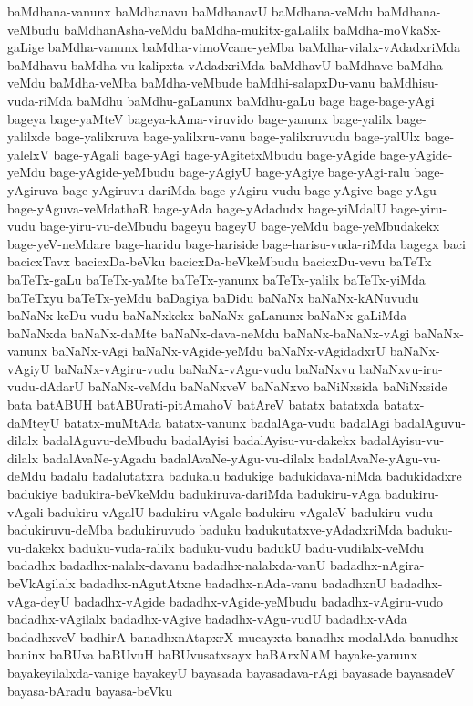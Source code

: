{baMdhana-vanunx
baMdhanavu
baMdhanavU
baMdhana-veMdu
baMdhana-veMbudu
baMdhanAsha-veMdu
baMdha-mukitx-gaLalilx
baMdha-moVkaSx-gaLige
baMdha-vanunx
baMdha-vimoVcane-yeMba
baMdha-vilalx-vAdadxriMda
baMdhavu
baMdha-vu-kalipxta-vAdadxriMda
baMdhavU
baMdhave
baMdha-veMdu
baMdha-veMba
baMdha-veMbude
baMdhi-salapxDu-vanu
baMdhisu-vuda-riMda
baMdhu
baMdhu-gaLanunx
baMdhu-gaLu
bage
bage-bage-yAgi
bageya
bage-yaMteV
bageya-kAma-viruvido
bage-yanunx
bage-yalilx
bage-yalilxde
bage-yalilxruva
bage-yalilxru-vanu
bage-yalilxruvudu
bage-yalUlx
bage-yalelxV
bage-yAgali
bage-yAgi
bage-yAgitetxMbudu
bage-yAgide
bage-yAgide-yeMdu
bage-yAgide-yeMbudu
bage-yAgiyU
bage-yAgiye
bage-yAgi-ralu
bage-yAgiruva
bage-yAgiruvu-dariMda
bage-yAgiru-vudu
bage-yAgive
bage-yAgu
bage-yAguva-veMdathaR
bage-yAda
bage-yAdadudx
bage-yiMdalU
bage-yiru-vudu
bage-yiru-vu-deMbudu
bageyu
bageyU
bage-yeMdu
bage-yeMbudakekx
bage-yeV-neMdare
bage-haridu
bage-hariside
bage-harisu-vuda-riMda
bagegx
baci
bacicxTavx
bacicxDa-beVku
bacicxDa-beVkeMbudu
bacicxDu-vevu
baTeTx
baTeTx-gaLu
baTeTx-yaMte
baTeTx-yanunx
baTeTx-yalilx
baTeTx-yiMda
baTeTxyu
baTeTx-yeMdu
baDagiya
baDidu
baNaNx
baNaNx-kANuvudu
baNaNx-keDu-vudu
baNaNxkekx
baNaNx-gaLanunx
baNaNx-gaLiMda
baNaNxda
baNaNx-daMte
baNaNx-dava-neMdu
baNaNx-baNaNx-vAgi
baNaNx-vanunx
baNaNx-vAgi
baNaNx-vAgide-yeMdu
baNaNx-vAgidadxrU
baNaNx-vAgiyU
baNaNx-vAgiru-vudu
baNaNx-vAgu-vudu
baNaNxvu
baNaNxvu-iru-vudu-dAdarU
baNaNx-veMdu
baNaNxveV
baNaNxvo
baNiNxsida
baNiNxside
bata
batABUH
batABUrati-pitAmahoV
batAreV
batatx
batatxda
batatx-daMteyU
batatx-muMtAda
batatx-vanunx
badalAga-vudu
badalAgi
badalAguvu-dilalx
badalAguvu-deMbudu
badalAyisi
badalAyisu-vu-dakekx
badalAyisu-vu-dilalx
badalAvaNe-yAgadu
badalAvaNe-yAgu-vu-dilalx
badalAvaNe-yAgu-vu-deMdu
badalu
badalutatxra
badukalu
badukige
badukidava-niMda
badukidadxre
badukiye
badukira-beVkeMdu
badukiruva-dariMda
badukiru-vAga
badukiru-vAgali
badukiru-vAgalU
badukiru-vAgale
badukiru-vAgaleV
badukiru-vudu
badukiruvu-deMba
badukiruvudo
baduku
badukutatxve-yAdadxriMda
baduku-vu-dakekx
baduku-vuda-ralilx
baduku-vudu
badukU
badu-vudilalx-veMdu
badadhx
badadhx-nalalx-davanu
badadhx-nalalxda-vanU
badadhx-nAgira-beVkAgilalx
badadhx-nAgutAtxne
badadhx-nAda-vanu
badadhxnU
badadhx-vAga-deyU
badadhx-vAgide
badadhx-vAgide-yeMbudu
badadhx-vAgiru-vudo
badadhx-vAgilalx
badadhx-vAgive
badadhx-vAgu-vudU
badadhx-vAda
badadhxveV
badhirA
banadhxnAtapxrX-mucayxta
banadhx-modalAda
banudhx
baninx
baBUva
baBUvuH
baBUvusatxsayx
baBArxNAM
bayake-yanunx
bayakeyilalxda-vanige
bayakeyU
bayasada
bayasadava-rAgi
bayasade
bayasadeV
bayasa-bAradu
bayasa-beVku
}
